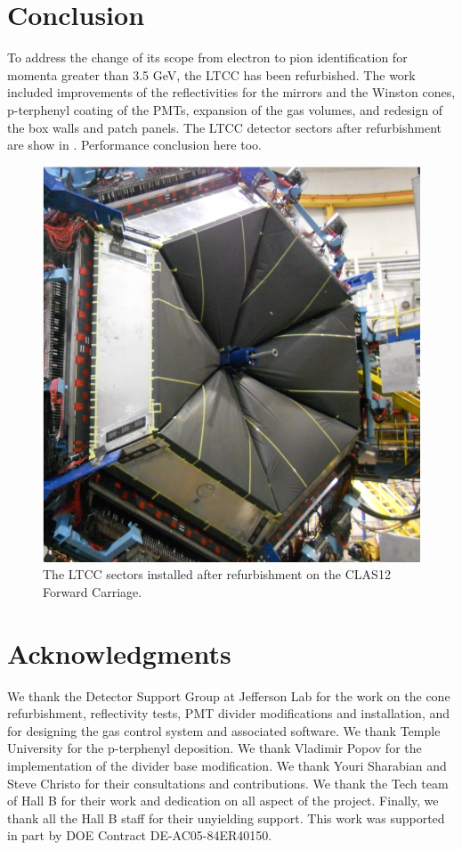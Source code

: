 \section{Conclusion}

To address the change of its scope from electron to pion identification for momenta
greater than 3.5 GeV, the LTCC has been refurbished. The work included improvements of the
reflectivities for the mirrors and the Winston cones, p-terphenyl
coating of the PMTs, expansion of the gas volumes, and redesign of the box walls and patch panels.
The LTCC detector sectors after refurbishment are show in .
Performance conclusion here too.

\begin{figure}
	\centering
	\includegraphics[width=1.0\columnwidth,keepaspectratio]{img/ltccInstalled.png}
	\caption{The LTCC sectors installed after refurbishment on the CLAS12 Forward Carriage.}
	\label{fig:ltccInstalled}
\end{figure}


\section{Acknowledgments}

We thank the Detector Support Group at Jefferson Lab for the work on the cone refurbishment, reflectivity tests,
PMT divider modifications and installation, and for designing the gas control system and associated software.
We thank Temple University for the p-terphenyl deposition. We thank Vladimir Popov for the implementation
of the divider base modification. We thank Youri Sharabian and Steve Christo for their consultations and contributions.
We thank the Tech team of Hall B for their work and dedication on all aspect of the project.
Finally, we thank all the Hall B staff for their unyielding support.
This work was supported in part by DOE Contract DE-AC05-84ER40150.

